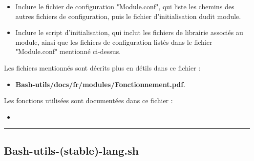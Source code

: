 \documentclass[a4paper,10pt]{article}
\begin{document}
    \begin{justify}
        \begin{itemize}
            \item Inclure le fichier de configuration "Module.conf", qui liste les chemins des autres fichiers de configuration, puis le fichier d'initialisation dudit module.
        \end{itemize}
    \end{justify}

    \begin{justify}
        \begin{itemize}
            \item Inclure le script d'initialisation, qui inclut les fichiers de librairie associés au module, ainsi que les fichiers de configuration listés dans le fichier "Module.conf" mentionné ci-dessus.
        \end{itemize}
    \end{justify}

    \begin{justify}
        Les fichiers mentionnés sont décrits plus en détils dans ce fichier :

        \begin{itemize}
            \item \textbf{\color{path}Bash-utils/docs/fr/modules/Fonctionnement.pdf}.
        \end{itemize}
    \end{justify}

    \begin{justify}
        Les fonctions utilisées sont documentées dans ce fichier :

        \begin{itemize}
            \item \textbf{\color{path}}
        \end{itemize}

    \end{justify}




    \color{sec2}\par\noindent\rule{\textwidth}{0.4pt}\color{text}

    \color{sec2}
    \subsection{\color{path}Bash-utils-(stable)-lang.sh}\color{text}
\end{document}
